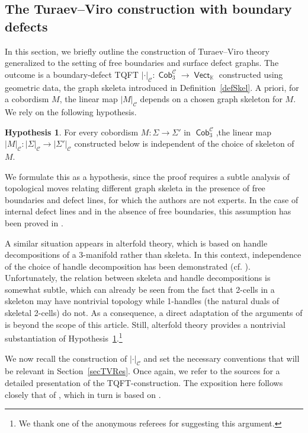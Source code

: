 \documentclass[pdftex]{sigma}
\DeclareMathOperator{\vect}{\mathsf{Vect}}
\DeclareMathOperator{\K}{\mathbb{K}}
\DeclareMathOperator{\Cob}{\mathsf{Cob}}
\DeclareMathOperator{\calc}{\mathcal{C}}
\numberwithin{equation}{section}
\theoremstyle{definition}
\newtheorem{Hypothesis}[Hypothesis]{Hypothesis}
\begin{document}
\subsection{The Turaev--Viro construction with boundary defects}
\label{subSecTV}
In this section, we briefly outline the construction of Turaev--Viro theory generalized to the setting of free boundaries and surface defect graphs. The outcome is a boundary-defect TQFT $|\cdot|_{\calc}\colon \Cob_3^{\calc} \rightarrow \vect_{\K}$ constructed using geometric data, the graph skeleta introduced in Definition~\ref{defSkel}. A priori, for a cobordism $M$, the linear map $|M|_{\calc}$ depends on a chosen graph skeleton for $M$. We rely on the following hypothesis.
\begin{Hypothesis}
 \label{hyp}
 For every cobordism $M\colon \Sigma \rightarrow \Sigma'$ in $\Cob_3^{\calc}$,the linear map $|M|_{\calc}\colon |\Sigma|_{\calc} \rightarrow |\Sigma'|_{\calc}$ constructed below is independent of the choice of skeleton of $M$.
\end{Hypothesis}
We formulate this as a hypothesis, since the proof requires a subtle analysis of topological moves relating different graph skeleta in the presence of free boundaries and defect lines, for which the authors are not experts. In the case of internal defect lines and in the absence of free boundaries, this assumption has been proved in \cite[Theorems~15.7 and~15.8]{TV}.

A similar situation appears in alterfold theory, which is based
on handle decompositions of a 3\nobreakdash-manifold rather than skeleta. In this context,
independence of the choice of handle decomposition has been demonstrated
(cf. \cite[Theorems~3.9 and~3.21, Remark~3.22]{LMWW}). Unfortunately, the
relation between skeleta and handle decompositions is somewhat subtle, which can
already be seen from the fact that 2-cells in a skeleton may have nontrivial topology while
1-handles (the natural duals of skeletal 2-cells) do not. As a consequence, a direct adaptation of the arguments
of \cite{LMWW} is beyond the scope of this article. Still, alterfold
theory provides a nontrivial substantiation of Hypothesis~\ref{hyp}.\footnote{We thank one of the anonymous referees for suggesting this argument.}

We now recall the construction of $|\cdot|_{\calc}$ and set the necessary conventions that will be relevant in Section~\ref{secTVRes}. Once again, we refer to the sources \cite{TV, FS} for a detailed presentation of the TQFT-construction. The exposition here follows closely that of \cite{F}, which in turn is based on \cite[Chapters 12--15]{TV}.
\end{document}
